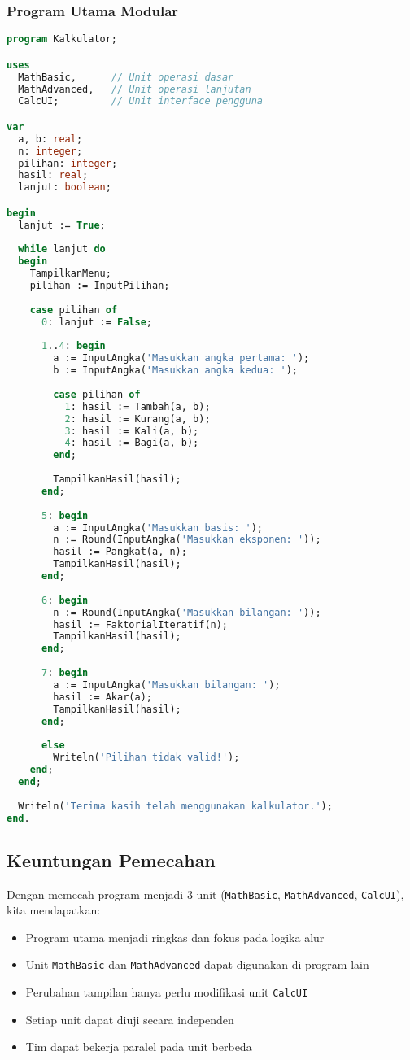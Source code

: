 \documentclass[../main.tex]{subfiles}
\begin{document}
\subsubsection{Program Utama Modular}
\begin{lstlisting}[language=Pascal, caption={kalkulator.pas - program utama modular}]
program Kalkulator;

uses
  MathBasic,      // Unit operasi dasar
  MathAdvanced,   // Unit operasi lanjutan
  CalcUI;         // Unit interface pengguna

var
  a, b: real;
  n: integer;
  pilihan: integer;
  hasil: real;
  lanjut: boolean;

begin
  lanjut := True;
  
  while lanjut do
  begin
    TampilkanMenu;
    pilihan := InputPilihan;
    
    case pilihan of
      0: lanjut := False;
      
      1..4: begin
        a := InputAngka('Masukkan angka pertama: ');
        b := InputAngka('Masukkan angka kedua: ');
        
        case pilihan of
          1: hasil := Tambah(a, b);
          2: hasil := Kurang(a, b);
          3: hasil := Kali(a, b);
          4: hasil := Bagi(a, b);
        end;
        
        TampilkanHasil(hasil);
      end;
      
      5: begin
        a := InputAngka('Masukkan basis: ');
        n := Round(InputAngka('Masukkan eksponen: '));
        hasil := Pangkat(a, n);
        TampilkanHasil(hasil);
      end;
      
      6: begin
        n := Round(InputAngka('Masukkan bilangan: '));
        hasil := FaktorialIteratif(n);
        TampilkanHasil(hasil);
      end;
      
      7: begin
        a := InputAngka('Masukkan bilangan: ');
        hasil := Akar(a);
        TampilkanHasil(hasil);
      end;
      
      else
        Writeln('Pilihan tidak valid!');
    end;
  end;
  
  Writeln('Terima kasih telah menggunakan kalkulator.');
end.
\end{lstlisting}

\subsection{Keuntungan Pemecahan}
Dengan memecah program menjadi 3 unit (\texttt{MathBasic}, \texttt{MathAdvanced}, \texttt{CalcUI}), kita mendapatkan:
\begin{itemize}
  \item Program utama menjadi ringkas dan fokus pada logika alur
  \item Unit \texttt{MathBasic} dan \texttt{MathAdvanced} dapat digunakan di program lain
  \item Perubahan tampilan hanya perlu modifikasi unit \texttt{CalcUI}
  \item Setiap unit dapat diuji secara independen
  \item Tim dapat bekerja paralel pada unit berbeda
\end{itemize}
\end{document}
